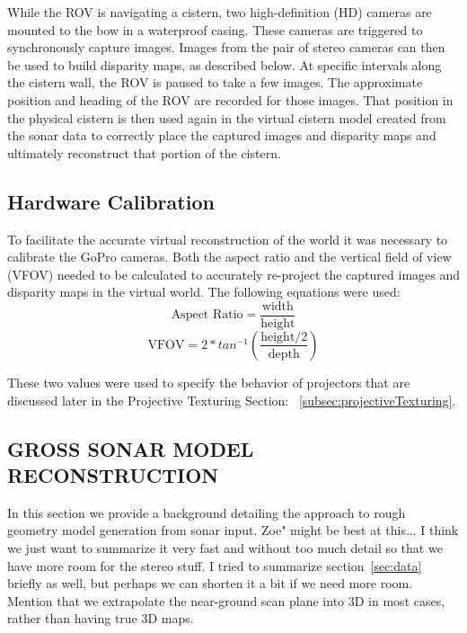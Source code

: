 \documentclass[a4paper,twoside]{article}
\begin{document}
While the ROV is navigating a cistern, two high-definition (HD) cameras are mounted to the bow in a waterproof casing.
These cameras are triggered to synchronously capture images.  
Images from the pair of stereo cameras can then be used to build disparity maps, as described below.  
At specific intervals along the cistern wall, the ROV is paused to take a few images.  
The approximate position and heading of the ROV are recorded for those images.  
That position in the physical cistern is then used again in the virtual cistern model created from the sonar data to correctly place the captured images and disparity maps and ultimately reconstruct that portion of the cistern. 

\subsection{Hardware Calibration}
To facilitate the accurate virtual reconstruction of the world it was necessary to calibrate the GoPro cameras.
  Both the aspect ratio and the vertical field of view (VFOV) needed to be calculated to accurately re-project the captured images and disparity maps in the virtual world.  
The following equations were used:
\[ \text{Aspect Ratio} = \frac{\text{width}}{\text{height}}\]
\[ \text{VFOV} = 2 * tan^{-1}(\frac{\text{height}/2}{\text{depth}}) \]


These two values were used to specify the behavior of projectors that are discussed later in the Projective Texturing Section: ~\ref{subsec:projectiveTexturing}.

\subsection{\uppercase{Gross sonar Model Reconstruction}}
\label{sec:reconstruction}




\noindent In this section we provide a background detailing the approach to rough geometry model generation from sonar input. Zoe" might be best at this... I think we just want to summarize it very fast and without too much detail so that we have more room for the stereo stuff. I tried to summarize section~\ref{sec:data} briefly as well, but perhaps we can shorten it a bit if we need more room. Mention that we extrapolate the near-ground scan plane into 3D in most cases, rather than having true 3D maps.
\end{document}
